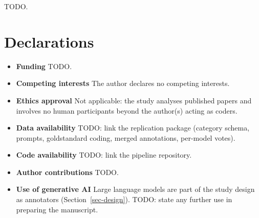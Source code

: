 
TODO.

\section*{Declarations}

\begin{itemize}
\item \textbf{Funding} TODO.
\item \textbf{Competing interests} The author declares no competing interests. %
\item \textbf{Ethics approval} Not applicable: the study analyses published papers and involves no human participants beyond the author(s) acting as coders. %
\item \textbf{Data availability} TODO: link the replication package (category schema, prompts, goldstandard coding, merged annotations, per-model votes).
\item \textbf{Code availability} TODO: link the pipeline repository.
\item \textbf{Author contributions} TODO.
\item \textbf{Use of generative AI} Large language models are part of the study design as annotators (Section~\ref{sec-design}). TODO: state any further use in preparing the manuscript.
\end{itemize}
